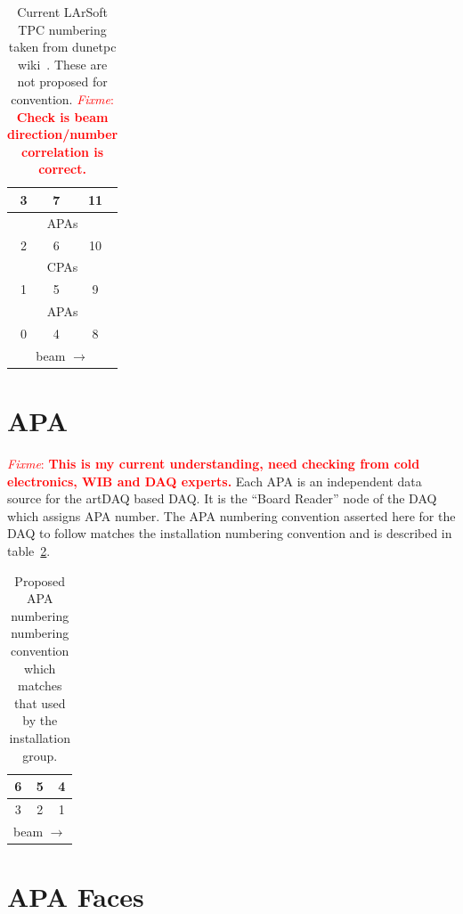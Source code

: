 \documentclass[pdftex,12pt,letter]{article}
\newcommand{\fixme}[1]{\textcolor{red}{\textit{Fixme}: \textbf{#1}}}
\begin{document}
\begin{table}[htp]
  \label{tab:lstpc}
  \centering
  \begin{tabular}[h]{|c|c|c|}
    \hline\hline
    3 & 7 & 11\\
    \hline
    \hline
    \multicolumn{3}{|c|}{APAs}\\
    \hline
    \hline
    2 & 6 & 10 \\
    \hline
    \hline
    \multicolumn{3}{|c|}{CPAs}\\
    \hline
    \hline
    1 & 5 & 9 \\
    \hline
    \hline
    \multicolumn{3}{|c|}{APAs}\\
    \hline
    \hline
    0 & 4 & 8 \\
    \hline
    \hline
    \multicolumn{3}{c}{beam $\longrightarrow$} \\    
  \end{tabular}
  \caption{Current LArSoft TPC numbering taken from dunetpc wiki~\cite{dunetpc-wiki}.  These are not proposed for convention. \fixme{Check is beam direction/number correlation is correct.}}
\end{table}


\section{APA}

\fixme{This is my current understanding, need checking from cold
  electronics, WIB and DAQ experts.}  Each APA is an independent data
source for the artDAQ based DAQ.  It is the ``Board Reader'' node of
the DAQ which assigns APA number.  The APA numbering convention
asserted here for the DAQ to follow matches the installation numbering
convention and is described in table~\ref{tab:apa}.

\begin{table}[htp]
  \label{tab:apa}
  \centering
  \begin{tabular}[h]{|c|c|c|}
    \hline
    6 & 5 & 4 \\
    \hline
    \hline
    3 & 2 & 1 \\
    \hline
    \hline
    \multicolumn{3}{c}{beam $\longrightarrow$} \\    

  \end{tabular}
  \caption{Proposed APA numbering numbering convention which matches that used by the installation group.}
\end{table}


\section{APA Faces}
\end{document}
